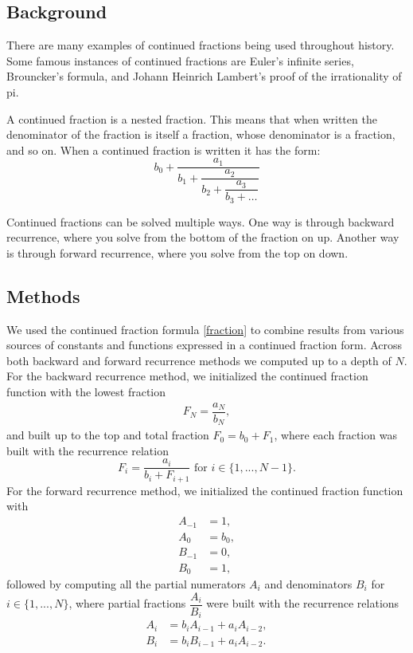 \documentclass[12pt]{article}
\begin{document}
\subsection*{Background}
There are many examples of continued fractions being used throughout history. Some famous instances of continued fractions are Euler's infinite series, Brouncker’s formula, and Johann Heinrich Lambert's proof of the irrationality of pi.

A continued fraction is a nested fraction. This means that when written the denominator of the fraction is itself a fraction, whose denominator is a fraction, and so on. When a continued fraction is written it has the form:
\begin{equation}
    b_0+\dfrac{a_1}{b_1+\dfrac{a_2}{b_2+\dfrac{a_3}{b_3+\dots}}}
    \label{fraction}
\end{equation}

Continued fractions can be solved multiple ways. One way is through backward recurrence, where you solve from the bottom of the fraction on up. Another way is through forward recurrence, where you solve from the top on down.

\subsection*{Methods}

We used the continued fraction formula \eqref{fraction} to combine results from various sources of constants and functions expressed in a continued fraction form. Across both backward and forward recurrence methods we computed up to a depth of $N$. For the backward recurrence method, we initialized the continued fraction function with the lowest fraction 
\begin{align*}
    F_N = \dfrac{a_N}{b_N},
\end{align*}
and built up to the top and total fraction $F_0 = b_0+F_1$, where each fraction was built with the recurrence relation
\begin{equation*}
    F_i = \dfrac{a_{i}}{b_{i}+F_{i+1}} \text{ for } i\in\{1,...,N-1\}.
\end{equation*}
For the forward recurrence method, we initialized the continued fraction function with
\begin{align*}
    A_{-1} &=1, \\
    A_0 &=b_0, \\
    B_{-1} &= 0, \\
    B_0 &= 1,
\end{align*}
followed by computing all the partial numerators $A_i$ and denominators $B_i$ for $i\in\{1,...,N\}$, where partial fractions $\dfrac{A_i}{B_i}$ were built with the recurrence relations
\begin{align*}
    A_i &= b_iA_{i-1}+a_iA_{i-2}, \\
    B_i &= b_iB_{i-1}+a_iA_{i-2}.
\end{align*}
\end{document}
